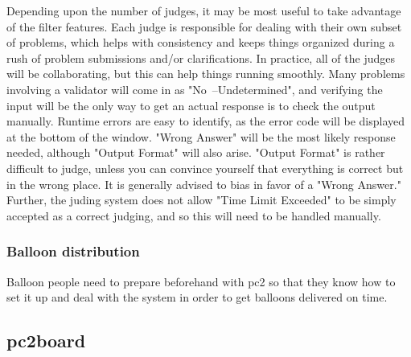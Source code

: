 Depending upon the number of judges, it may be most useful to take
advantage of the filter features. Each judge is responsible for
dealing with their own subset of problems, which helps with
consistency and keeps things organized during a rush of problem
submissions and/or clarifications. In practice, all of the judges will
be collaborating, but this can help things running smoothly. Many
problems involving a validator will come in as "No~--Undetermined",
and verifying the input will be the only way to get an actual response
is to check the output manually. Runtime errors are easy to identify,
as the error code will be displayed at the bottom of the
window. "Wrong Answer" will be the most likely response needed,
although "Output Format" will also arise. "Output Format" is rather
difficult to judge, unless you can convince yourself that everything
is correct but in the wrong place. It is generally advised to bias in
favor of a "Wrong Answer." Further, the juding system does not allow
"Time Limit Exceeded" to be simply accepted as a correct judging, and
so this will need to be handled manually.

\subsubsection{Balloon distribution}
\label{sec:pc2judge-balloons}

Balloon people need to prepare beforehand with pc2 so that they know
how to set it up and deal with the system in order to get balloons
delivered on time.

\subsection{pc2board}

